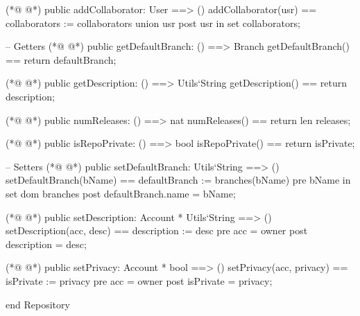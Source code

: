 \begin{vdmpp}[breaklines=true]
(*@
\label{addCollaborator:70}
@*)
  public addCollaborator: User ==> ()
  addCollaborator(usr) == collaborators := collaborators union {usr}
  post usr in set collaborators;
   
  -- Getters
(*@
\label{getDefaultBranch:75}
@*)
  public getDefaultBranch: () ==> Branch
  getDefaultBranch() == return defaultBranch;
  
(*@
\label{getDescription:78}
@*)
  public getDescription: () ==> Utils`String
  getDescription() == return description;
  
(*@
\label{numReleases:81}
@*)
  public numReleases: () ==> nat
  numReleases() == return len releases;
  
(*@
\label{isRepoPrivate:84}
@*)
  public isRepoPrivate: () ==> bool
  isRepoPrivate() == return isPrivate;
  
  -- Setters
(*@
\label{setDefaultBranch:88}
@*)
  public setDefaultBranch: Utils`String ==> ()
  setDefaultBranch(bName) == defaultBranch := branches(bName)
  pre bName in set dom branches
  post defaultBranch.name = bName;
 
(*@
\label{setDescription:93}
@*)
  public setDescription: Account * Utils`String ==> ()
  setDescription(acc, desc) == description := desc
  pre acc = owner
  post description = desc;
  
(*@
\label{setPrivacy:98}
@*)
  public setPrivacy: Account * bool ==> ()
  setPrivacy(acc, privacy) == isPrivate := privacy
  pre acc = owner
  post isPrivate = privacy;
  
end Repository
\end{vdmpp}
\bigskip
